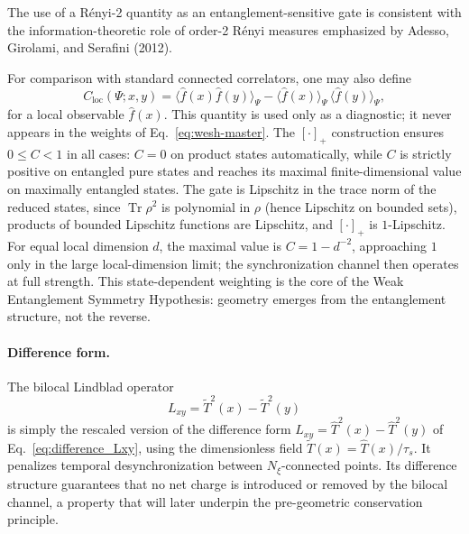 \documentclass[12pt,a4paper]{article}
\renewcommand{\Tr}{\operatorname{Tr}}
\numberwithin{equation}{section}
\begin{document}
\vspace{0.3cm}
\noindent The use of a R\'enyi-2 quantity as an entanglement-sensitive gate is consistent with the information-theoretic role of order-2 R\'enyi measures emphasized by Adesso, Girolami, and Serafini (2012).

\vspace{0.3cm}
\noindent For comparison with standard connected correlators, one may also define
\begin{equation}
C_{\text{loc}}(\Psi;x,y)
= \langle \hat{f}(x)\hat{f}(y)\rangle_\Psi
 - \langle \hat{f}(x)\rangle_\Psi\,\langle \hat{f}(y)\rangle_\Psi,
\label{eq:local-correlator}
\end{equation}
for a local observable $\hat f(x)$. This quantity is used only as a
diagnostic; it never appears in the weights of
Eq.~\eqref{eq:wesh-master}. The $[\cdot]_+$ construction ensures $0\leq C<1$ in all cases:
$C=0$ on product states automatically, while $C$ is strictly positive on
entangled pure states and reaches its maximal finite-dimensional value on
maximally entangled states. The gate is Lipschitz in the trace norm of the
reduced states, since $\Tr\rho^2$ is polynomial in $\rho$ (hence Lipschitz
on bounded sets), products of bounded Lipschitz functions are Lipschitz,
and $[\cdot]_+$ is $1$-Lipschitz. For equal local dimension $d$, the
maximal value is $C=1-d^{-2}$, approaching $1$ only in the large
local-dimension limit; the synchronization channel then operates at full
strength. This state-dependent weighting is the core of the Weak
Entanglement Symmetry Hypothesis: geometry emerges from the entanglement
structure, not the reverse.

\paragraph{Difference form.}
The bilocal Lindblad operator
\begin{equation}
L_{xy} = \tilde{T}^2(x) - \tilde{T}^2(y)
\label{eq:Lxy-rescaled}
\end{equation}
is simply the rescaled version of the difference form
$L_{xy} = \hat{T}^2(x) - \hat{T}^2(y)$ of Eq.~\eqref{eq:difference_Lxy},
using the dimensionless field $\tilde{T}(x)=\hat{T}(x)/\tau_s$.
It penalizes temporal desynchronization between $N_\xi$-connected points. Its difference structure guarantees that no net charge is introduced or removed by the bilocal channel, 
a property that will later underpin the pre-geometric conservation principle.
\end{document}

